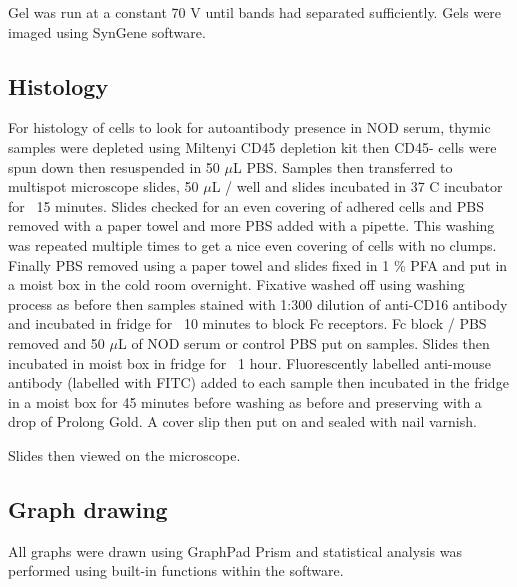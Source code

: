 Gel was run at a constant 70 V until bands had separated sufficiently.
Gels were imaged using SynGene software.

\subsection{Histology}

For histology of cells to look for autoantibody presence in NOD serum, thymic samples were depleted using Miltenyi CD45 depletion kit then CD45- cells were spun down then resuspended in 50 $\mu$L PBS.
Samples then transferred to multispot microscope slides, 50 $\mu$L / well and slides incubated in 37 \textdegree C incubator for ~15 minutes.
Slides checked for an even covering of adhered cells and PBS removed with a paper towel and more PBS added with a pipette. 
This washing was repeated multiple times to get a nice even covering of cells with no clumps.
Finally PBS removed using a paper towel and slides fixed in 1 \% PFA and put in a moist box in the cold room overnight.
Fixative washed off using washing process as before then samples stained with 1:300 dilution of anti-CD16 antibody and incubated in fridge for ~10 minutes to block Fc receptors.
Fc block / PBS removed and 50 $\mu$L of NOD serum or control PBS put on samples.
Slides then incubated in moist box in fridge for ~1 hour.
Fluorescently labelled anti-mouse antibody (labelled with FITC) added to each sample then incubated in the fridge in a moist box for 45 minutes before washing as before and preserving with a drop of Prolong Gold.
A cover slip then put on and sealed with nail varnish.

Slides then viewed on the microscope. 


\subsection{Graph drawing}

All graphs were drawn using GraphPad Prism and statistical analysis was performed using built-in functions within the software.
